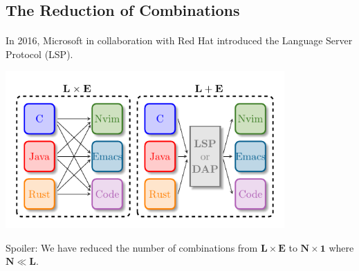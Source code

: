 \documentclass[9pt,xcolor=table,svgnames]{beamer}
\begin{document}
\subsection[The Reductions of Combinations]{The Reduction of Combinations}
\begin{frame}{\secname}
    \framesubtitle{\subsecname}

    In 2016, \alert{Microsoft} in collaboration with \alert{Red Hat} introduced the \alert{Language Server Protocol} (LSP).

    \pause
    \begin{center}
    \includegraphics[width=0.8\textwidth]{figs/lsp-combination.pdf}
    \end{center}

    \pause

    \huge Spoiler:
    \normalsize We have reduced the number of combinations from $\mathbf{L} \times \mathbf{E}$ to $\mathbf{N} \times \mathbf{1}$ where $\mathbf{N} \ll \mathbf{L}$.
\end{frame}
\end{document}
